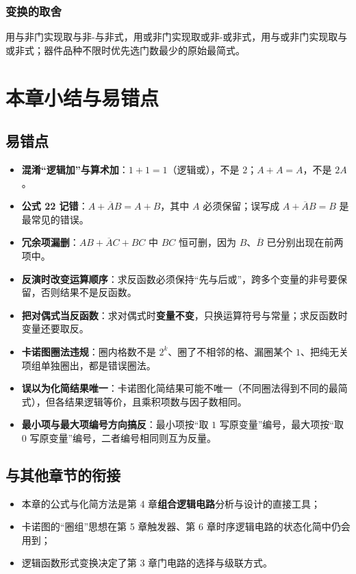 \subsubsection{变换的取舍}
用与非门实现取与非-与非式，用或非门实现取或非-或非式，用与或非门实现取与或非式；器件品种不限时优先选门数最少的原始最简式。

\section{本章小结与易错点}
\subsection{易错点}
\begin{itemize}
    \item \textbf{混淆``逻辑加''与算术加}：$1+1=1$（逻辑或），不是 $2$；$A+A=A$，不是 $2A$。
    \item \textbf{公式 22 记错}：$A+\overline{A}B=A+B$，其中 $A$ 必须保留；误写成 $A+\overline{A}B=B$ 是最常见的错误。
    \item \textbf{冗余项漏删}：$AB+\overline{A}C+BC$ 中 $BC$ 恒可删，因为 $B$、$\overline{B}$ 已分别出现在前两项中。
    \item \textbf{反演时改变运算顺序}：求反函数必须保持``先与后或''，跨多个变量的非号要保留，否则结果不是反函数。
    \item \textbf{把对偶式当反函数}：求对偶式时\textbf{变量不变}，只换运算符号与常量；求反函数时变量还要取反。
    \item \textbf{卡诺图圈法违规}：圈内格数不是 $2^{k}$、圈了不相邻的格、漏圈某个 $1$、把纯无关项组单独圈出，都是错误圈法。
    \item \textbf{误以为化简结果唯一}：卡诺图化简结果可能不唯一（不同圈法得到不同的最简式），但各结果逻辑等价，且乘积项数与因子数相同。
    \item \textbf{最小项与最大项编号方向搞反}：最小项按``取 $1$ 写原变量''编号，最大项按``取 $0$ 写原变量''编号，二者编号相同则互为反量。
\end{itemize}

\subsection{与其他章节的衔接}
\begin{itemize}
    \item 本章的公式与化简方法是第 4 章\textbf{组合逻辑电路}分析与设计的直接工具；
    \item 卡诺图的``圈组''思想在第 5 章触发器、第 6 章时序逻辑电路的状态化简中仍会用到；
    \item 逻辑函数形式变换决定了第 3 章门电路的选择与级联方式。
\end{itemize}